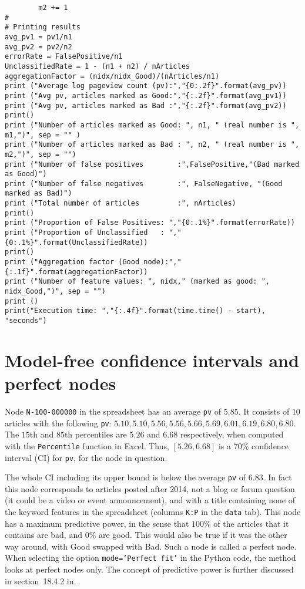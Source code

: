 \documentclass[oneside,10pt]{book}
\begin{document}
\begin{lstlisting}
        m2 += 1
#
# Printing results
avg_pv1 = pv1/n1
avg_pv2 = pv2/n2
errorRate = FalsePositive/n1
UnclassifiedRate = 1 - (n1 + n2) / nArticles
aggregationFactor = (nidx/nidx_Good)/(nArticles/n1)
print ("Average log pageview count (pv):","{0:.2f}".format(avg_pv))
print ("Avg pv, articles marked as Good:","{:.2f}".format(avg_pv1))
print ("Avg pv, articles marked as Bad :","{:.2f}".format(avg_pv2))
print()
print ("Number of articles marked as Good: ", n1, " (real number is ", m1,")", sep = "" )
print ("Number of articles marked as Bad : ", n2, " (real number is ", m2,")", sep = "")
print ("Number of false positives        :",FalsePositive,"(Bad marked as Good)")
print ("Number of false negatives        :", FalseNegative, "(Good marked as Bad)")
print ("Total number of articles         :", nArticles)
print()
print ("Proportion of False Positives: ","{0:.1%}".format(errorRate))
print ("Proportion of Unclassified   : ","{0:.1%}".format(UnclassifiedRate))
print()
print ("Aggregation factor (Good node):","{:.1f}".format(aggregationFactor))
print ("Number of feature values: ", nidx," (marked as good: ", nidx_Good,")", sep = "")
print ()
print("Execution time: ","{:.4f}".format(time.time() - start), "seconds")
\end{lstlisting}

\section{Model-free confidence intervals and perfect nodes}


Node \texttt{N-100-000000} in the spreadsheet has an average 
\texttt{pv} of $5.85$. It consists of $10$ articles with  
the following \texttt{pv}: $5.10, 5.10, 5.56, 5.56, 5.66, 5.69, 6.01,  6.19, 6.80, 6.80$. The $15$th and $85$th percentiles are $5.26$ and $6.68$ respectively, when computed with the \texttt{Percentile} function in Excel. Thus, $[5.26, 6.68]$ is a $70\%$ \textcolor{index}{confidence interval} (CI) for \texttt{pv}, for the node
 in question. 


The whole CI including its upper bound is below the average \texttt{pv} of $6.83$. In fact this node corresponds to articles posted after 2014, not a blog or forum question (it could be a video or event announcement), and with a title containing none of the keyword features in the spreadsheet 
(columns \texttt{K:P} in the \texttt{data} tab). This node  has a maximum predictive power, in the sense that $100\%$ of the articles that it contains are bad, and $0\%$ 
 are good. This would also be true if it was the other way around, with Good swapped with Bad. Such a node is called a \textcolor{index}{perfect node}. When selecting the option 
\texttt{mode='Perfect fit'} in the Python code,
the method looks at perfect nodes only. The concept of \textcolor{index}{predictive power} is further discussed in section~18.4.2 in~\cite{vgelsevier}.
\end{document}
